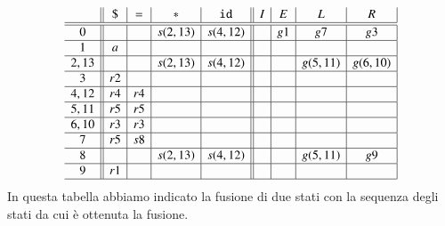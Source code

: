 \[
\begin{array}{c||c|c|c|c||c|c|c|c|}
  & \mathtt{\$} & \mathtt{=} & \mathtt{*} & \mathtt{id} & I  & E  & L  & R  \\\hline\hline
0 &             &            & s(2,13)    & s(4,12)     &    & g1 & g7 & g3 \\\hline
1 & a           &            &            &             &    &    &    &    \\\hline
2,13 &             &            & s(2,13)    & s(4,12)     &    &    & g(5,11) & g(6,10) \\\hline
3 & r2          &            &            &             &    &    &    &    \\\hline
4,12 & r4          & r4         &            &             &    &    &    &    \\\hline
5,11 & r5          & r5         &            &             &    &    &    &    \\\hline
6,10 & r3          & r3         &            &             &    &    &    &    \\\hline
7 & r5          & s8         &            &             &    &    &    &    \\\hline
8 &             &            & s(2,13)    & s(4,12)     &    &    & g(5,11)& g9 \\\hline
9 & r1          &            &            &             &    &    &    &    \\\hline
\end{array}
\]
%
In questa tabella abbiamo indicato la fusione di due stati con la sequenza degli
stati da cui \`e ottenuta la fusione.

